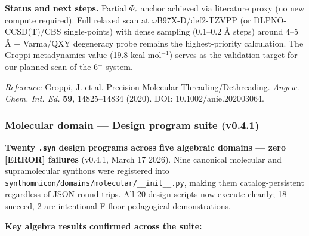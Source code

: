 \documentclass[12pt,a4paper]{article}
\begin{document}
\textbf{Status and next steps.} Partial $\Phi_c$ anchor achieved via literature proxy (no new compute required). Full relaxed scan at $\omega$B97X-D/def2-TZVPP (or DLPNO-CCSD(T)/CBS single-points) with dense sampling (0.1--0.2 Å steps) around 4--5 Å + Varma/QXY degeneracy probe remains the highest-priority calculation. The Groppi metadynamics value (19.8 kcal mol$^{-1}$) serves as the validation target for our planned scan of the 6$^+$ system.

\emph{Reference:} Groppi, J. et al. Precision Molecular Threading/Dethreading. \emph{Angew. Chem. Int. Ed.} \textbf{59}, 14825--14834 (2020). DOI: 10.1002/anie.202003064.

\subsubsection{Molecular domain --- Design program suite (v0.4.1)}

\textbf{Twenty \texttt{.syn} design programs across five algebraic domains --- zero {[}ERROR{]} failures} (v0.4.1, March 17 2026). Nine canonical molecular and supramolecular synthons were registered into \texttt{synthomnicon/domains/molecular/\_\_init\_\_.py}, making them catalog-persistent regardless of JSON round-trips. All 20 design scripts now execute cleanly; 18 succeed, 2 are intentional F-floor pedagogical demonstrations.

\textbf{Key algebra results confirmed across the suite:}
\end{document}
